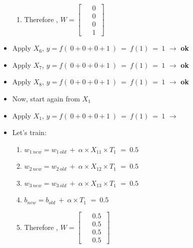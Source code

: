 \documentclass[12pt]{article}
\begin{document}
\begin{itemize}
{\begin{enumerate}
				\item Therefore , $ W= \begin{bmatrix}
					\phantom{-}0\ \\ 	
					\phantom{-}0\ \\ 	
					\phantom{-}0\  \\ 
					\phantom{-}1\   
				\end{bmatrix}$
				
			\end{enumerate}
			
		}
		
		\item Apply $X_6$, $y = f(\ 0 + 0 + 0 + 1\ ) \ = \ f(1) \ = \ 1 $ $\rightarrow$ \textbf{ok}
		
		\item Apply $X_7$, $y = f(\ 0 + 0 + 0 + 1\ ) \ = \ f(1) \ = \ 1 $ $\rightarrow$ \textbf{ok}
		
		\item Apply $X_8$, $y = f(\ 0 + 0 + 0 + 1\ ) \ = \ f(1) \ = \ 1 $ $\rightarrow$ \textbf{ok}
		
		\item Now, start again from $X_1$
		
		\item Apply $X_1$, $y = f(\ 0 + 0 + 0 + 1\ ) \ = \ f(1) \ = \ 1 $ $\rightarrow$ 
		
		\item Let's train:
		{
			\begin{enumerate}
				
				\item $w_{1\ new} = w_{1\ old}\ +\ \alpha \times X_{11} \times T_1$ $=\ 0.5$ 
				\item $w_{2\ new} = w_{2\ old}\ +\ \alpha \times X_{12} \times T_1$ $=\ 0.5$ 
				\item $w_{3\ new} = w_{3\ old}\ +\ \alpha \times X_{13} \times T_1$ $=\ 0.5$ 
				\item $b_{new} = b_{old} \ + \ \alpha \times T_1$ $= \ 0.5$
				
				\item Therefore , $ W= \begin{bmatrix}
					\phantom{-}0.5\ \\ 	
					\phantom{-}0.5\ \\ 	
					\phantom{-}0.5\  \\ 
					\phantom{-}0.5\   
				\end{bmatrix}$
				
			\end{enumerate}
			
}
\end{itemize}
\end{document}
